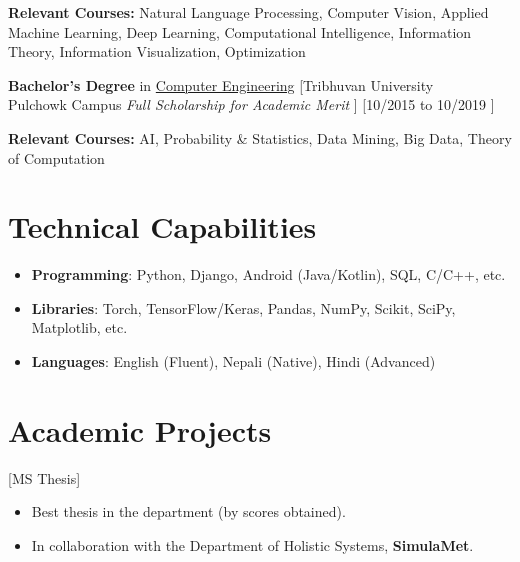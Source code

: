 \documentclass{resume}
\begin{document}
\textbf{Relevant Courses:} Natural Language Processing, Computer Vision, Applied Machine Learning, Deep Learning, Computational Intelligence, Information Theory, Information Visualization, Optimization 

\ResumeItem
{\textbf{ Bachelor's Degree}  in \href{ http://doece.pcampus.edu.np/index.php/bachelor-in-computer-engineering}{Computer Engineering}}
[Tribhuvan University\\
Pulchowk Campus \qquad  \textit{Full Scholarship for Academic Merit}
]
[10/2015 to 10/2019 ]

\textbf{Relevant Courses:} AI, Probability \& Statistics, Data Mining, Big Data, Theory of Computation 



\section[Technical Capabilities]{Technical Capabilities\protect}
\begin{itemize}
   \item \textbf{Programming}: Python, Django, Android (Java/Kotlin), SQL, C/C++, etc.
   \item \textbf{Libraries}: Torch, TensorFlow/Keras, Pandas, NumPy, Scikit, SciPy, Matplotlib, etc.
   \item \textbf{Languages}:
   English (Fluent), Nepali (Native), Hindi (Advanced)
\end{itemize}

\section{Academic Projects}

[MS Thesis]
\begin{itemize}
\item Best thesis in the department (by scores obtained).
\item In collaboration with the Department of Holistic Systems, \textbf{SimulaMet}.
\end{itemize}
\end{document}
